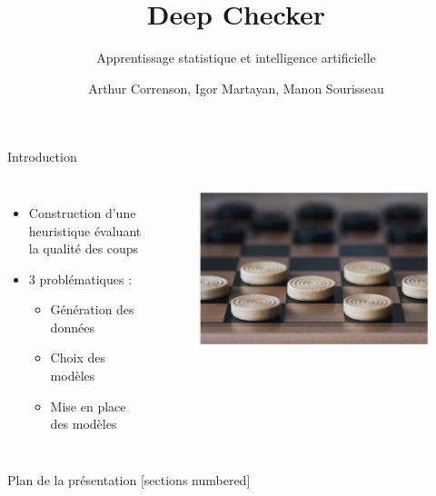 \documentclass{beamer}
\title{Deep Checker}
\subtitle{Apprentissage statistique et intelligence artificielle}
\date{}
\author{Arthur Correnson, Igor Martayan, Manon Sourisseau}
\institute{Projet de Statistiques, ENS, 2021}
\begin{document}
{\maketitle}

\begin{frame}{Introduction}
    \begin{columns}
        \begin{itemize}
            \item Construction d'une \alert{heuristique} évaluant la qualité des coups
            \item 3 problématiques :
                  \begin{itemize}
                      \item Génération des données
                      \item Choix des modèles
                      \item Mise en place des modèles
                  \end{itemize}
        \end{itemize}
        \begin{figure}
            \centering
            \includegraphics[width=\columnwidth]{im/dames.png}
        \end{figure}
    \end{columns}
\end{frame}

\begin{frame}{Plan de la présentation}
    [sections numbered]
    \tableofcontents
\end{frame}
\end{document}
